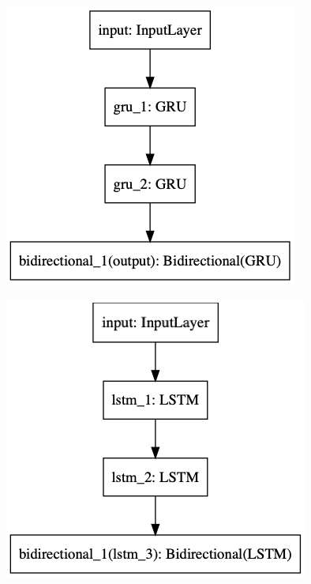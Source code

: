 \begin{figure}[h]
\centering
\begin{minipage}{.45\textwidth}
  \centering
  \includegraphics[width=1\linewidth]{./img/gru_architecture.png}
  \label{fig:gru_architecture}
\end{minipage}%
\begin{minipage}{.45\textwidth}
  \centering
  \includegraphics[width=1\linewidth]{./img/lstm_architecture.png}
  \label{fig:lstm_architecture}
\end{minipage}
\end{figure}\label{fig:nn_architectures}


